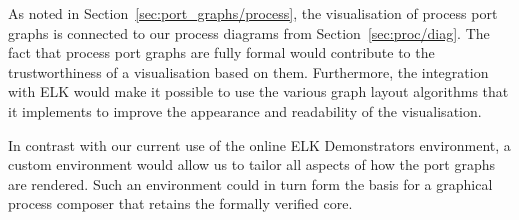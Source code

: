 \documentclass[class=smolathesis,crop=false]{standalone}
\begin{document}
\cbstart
As noted in Section~\ref{sec:port_graphs/process}, the visualisation of process port graphs is connected to our process diagrams from Section~\ref{sec:proc/diag}.
The fact that process port graphs are fully formal would contribute to the trustworthiness of a visualisation based on them.
Furthermore, the integration with ELK would make it possible to use the various graph layout algorithms that it implements to improve the appearance and readability of the visualisation.
\cbend

In contrast with our current use of the online ELK Demonstrators environment, a custom environment would allow us to tailor all aspects of how the port graphs are rendered.
Such an environment could in turn form the basis for a graphical process composer that retains the formally verified core.

\ifstandalone


\fi
\end{document}
